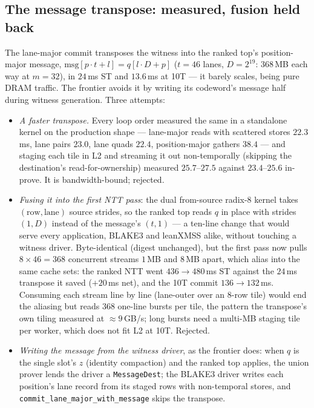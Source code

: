 \documentclass[11pt]{article}
\newcommand{\code}[1]{\texttt{#1}}
\begin{document}
\subsection{The message transpose: measured, fusion held back}\label{sec:fusedmsg}

The lane-major commit transposes the witness into the ranked top's
position-major message, $\mathrm{msg}[p\cdot t+l]=q[l\cdot D+p]$
($t=46$ lanes, $D=2^{19}$: $368\,$MB each way at $m{=}32$), in
$24\,$ms ST and $13.6\,$ms at 10T --- it barely scales, being pure DRAM
traffic. The frontier avoids it by writing its codeword's message half
during witness generation. Three attempts:

\begin{itemize}
\item \emph{A faster transpose.} Every loop order measured the same in a
standalone kernel on the production shape --- lane-major reads with
scattered stores $22.3\,$ms, lane pairs $23.0$, lane quads $22.4$,
position-major gathers $38.4$ --- and staging each tile in L2 and
streaming it out non-temporally (skipping the destination's
read-for-ownership) measured $25.7$--$27.5$ against $23.4$--$25.6$
in-prove. It is bandwidth-bound; rejected.
\item \emph{Fusing it into the first NTT pass}: the dual from-source
radix-8 kernel takes $(\text{row},\text{lane})$ source strides, so the
ranked top reads $q$ in place with strides $(1, D)$ instead of the
message's $(t, 1)$ --- a ten-line change that would serve every
application, BLAKE3 and leanXMSS alike, without touching a witness
driver. Byte-identical (digest unchanged), but the first pass now pulls
$8\times46=368$ concurrent streams $1\,$MB and $8\,$MB apart, which
alias into the same cache sets: the ranked NTT went $436\to480\,$ms ST
against the $24\,$ms transpose it saved ($+20\,$ms net), and the 10T
commit $136\to132\,$ms. Consuming each stream line by line (lane-outer
over an $8$-row tile) would end the aliasing but reads $368$ one-line
bursts per tile, the pattern the transpose's own tiling measured at
$\approx9\,$GB/s; long bursts need a multi-MB staging tile per worker,
which does not fit L2 at 10T. Rejected.
\item \emph{Writing the message from the witness driver}, as the frontier
does: when $q$ is the single slot's $z$ (identity compaction) and the
ranked top applies, the union prover lends the driver a
\code{MessageDest}; the BLAKE3 driver writes each position's lane record
from its staged rows with non-temporal stores, and
\code{commit\_lane\_major\_with\_message} skips the transpose.

\end{itemize}
\end{document}
